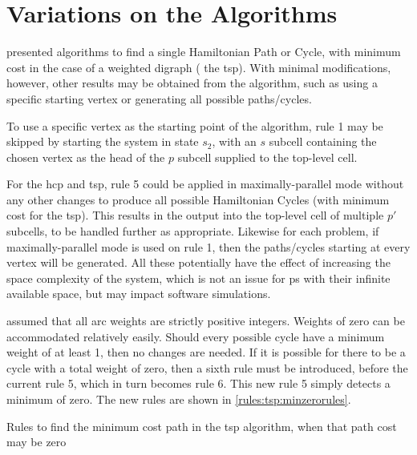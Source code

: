 \section{\label{sec:tsp:variations}Variations on the Algorithms}
 presented algorithms to find a single Hamiltonian Path or Cycle, with minimum cost in the case of a weighted digraph (\ie{} the \gls{tsp}).  With minimal modifications, however, other results may be obtained from the algorithm, such as using a specific starting vertex or generating all possible paths/cycles.

To use a specific vertex as the starting point of the algorithm, rule 1 may be skipped by starting the system in state \(s_2\), with an \(s\) subcell containing the chosen vertex as the head of the \(p\) subcell supplied to the top-level cell.

For the \gls{hcp} and \gls{tsp}, rule 5 could be applied in maximally-parallel mode without any other changes to produce all possible Hamiltonian Cycles (with minimum cost for the \gls{tsp}).  This results in the output into the top-level cell of multiple \(p'\) subcells, to be handled further as appropriate.  Likewise for each problem, if maximally-parallel mode is used on rule 1, then the paths/cycles starting at every vertex will be generated.  All these potentially have the effect of increasing the space complexity of the system, which is not an issue for \gls{ps} with their infinite available space, but may impact software simulations.

 assumed that all arc weights are strictly positive integers.  Weights of zero can be accommodated relatively easily.  Should every possible cycle have a minimum weight of at least 1, then no changes are needed.  If it is possible for there to be a cycle with a total weight of zero, then a sixth rule must be introduced, before the current rule 5, which in turn becomes rule 6.  This new rule 5 simply detects a minimum of zero.  The new rules are shown in \cref{rules:tsp:minzerorules}.


\begin{cprulesetfloat}
\begin{cpruleset}
    
    
\end{cpruleset}
\caption[Rules to find the minimum cost path when it may be zero]{\label{rules:tsp:minzerorules}Rules to find the minimum cost path in the \gls{tsp} algorithm, when that path cost may be zero}
\end{cprulesetfloat}